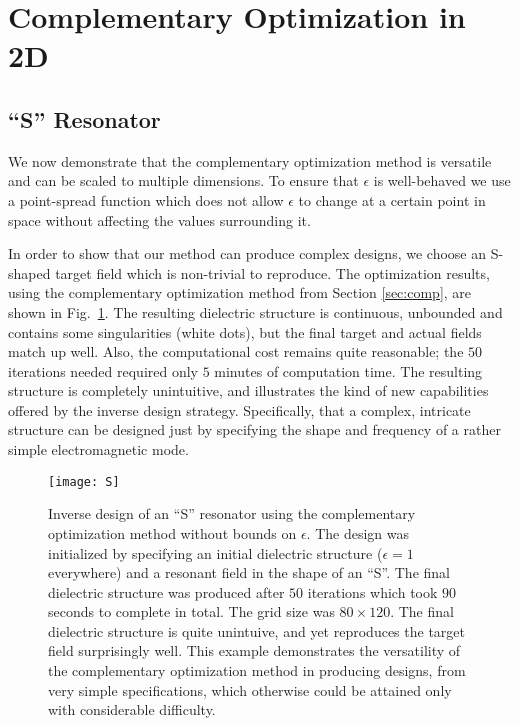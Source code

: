\documentclass[10pt,letterpaper]{article}
\begin{document}
\section{Complementary Optimization in 2D}
\subsection{``S'' Resonator}
We now demonstrate that the complementary optimization method is versatile and can be scaled to multiple dimensions. To ensure that $\epsilon$ is well-behaved we use a point-spread function which does not allow $\epsilon$ to change at a certain point in space without affecting the values surrounding it. 

In order to show that our method can produce complex designs, we choose an S-shaped target field which is non-trivial to reproduce. The optimization results, using the complementary optimization method from Section \ref{sec:comp}, are shown in Fig.~\ref{S pic}. The resulting dielectric structure is continuous, unbounded and contains some singularities (white dots), but the final target and actual fields match up well. Also, the computational cost remains quite reasonable; the $50$ iterations needed required only $5$ minutes of computation time. The resulting structure is completely unintuitive, and illustrates the kind of new capabilities offered by the inverse design strategy. Specifically, that a complex, intricate structure can be designed just by specifying the shape and frequency of a rather simple electromagnetic mode.
\begin{figure}\centering
\texttt{[image: S]}
\caption{Inverse design of an ``S'' resonator using the complementary optimization method without bounds on $\epsilon$. The design was initialized by specifying an initial dielectric structure ($\epsilon=1$ everywhere) and a resonant field in the shape of an ``S''. The final dielectric structure was produced after $50$ iterations which took $90$ seconds to complete in total. The grid size was $80\times 120$. The final dielectric structure is quite unintuive, and yet reproduces the target field surprisingly well. This example demonstrates the versatility of the complementary optimization method in producing designs, from very simple specifications, which otherwise could be attained only with considerable difficulty.}
\label{S pic}
\end{figure}
\end{document}
